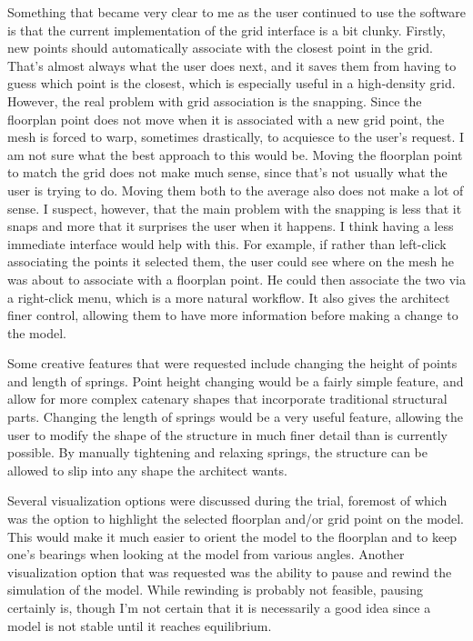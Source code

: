 \documentclass{thesis}
\begin{document}
Something that became very clear to me as the user continued to use the software is that the current implementation of the grid
interface is a bit clunky.  Firstly, new points should automatically associate with the closest point in the grid.  That's almost
always what the user does next, and it saves them from having to guess which point is the closest, which is especially useful in a
high-density grid.  However, the real problem with grid association is the snapping.  Since the floorplan point does not move when
it is associated with a new grid point, the mesh is forced to warp, sometimes drastically, to acquiesce to the user's request.
I am not sure what the best approach to this would be.  Moving the floorplan point to match the grid does not make much sense,
since that's not usually what the user is trying to do.  Moving them both to the average also does not make a lot of sense.
I suspect, however, that the main problem with the snapping is less that it snaps and more that it surprises the user when it
happens.  I think having a less immediate interface would help with this.  For example, if rather than left-click associating the
points it selected them, the user could see where on the mesh he was about to associate with a floorplan point.  He could then
associate the two via a right-click menu, which is a more natural workflow.  It also gives the architect finer control, allowing
them to have more information before making a change to the model.

Some creative features that were requested include changing the height of points and length of springs.  Point height changing
would be a fairly simple feature, and allow for more complex catenary shapes that incorporate traditional structural parts.
Changing the length of springs would be a very useful feature, allowing the user to modify the shape of the structure in much
finer detail than is currently possible.  By manually tightening and relaxing springs, the structure can be allowed to slip into
any shape the architect wants.

Several visualization options were discussed during the trial, foremost of which was the option to highlight the selected floorplan
and/or grid point on the model.  This would make it much easier to orient the model to the floorplan and to keep one's bearings
when looking at the model from various angles.  Another visualization option that was requested was the ability to pause and rewind
the simulation of the model.  While rewinding is probably not feasible, pausing certainly is, though I'm not certain that it is
necessarily a good idea since a model is not stable until it reaches equilibrium.
\end{document}
